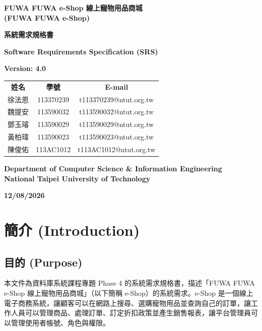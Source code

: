 \documentclass[12pt,a4paper]{article}
\newcommand{\projectname}{FUWA FUWA e-Shop 線上寵物用品商城}
\newcommand{\projectnameEN}{FUWA FUWA e-Shop}
\newcommand{\docdate}{12/08/2026}
\begin{document}
\begin{titlepage}
\centering
\vspace*{1.5cm}
{\Large\bfseries \projectname\\[0.3em] (\projectnameEN)\par}
\vspace{1.5cm}
{\LARGE\bfseries 系統需求規格書\par}
\vspace{0.5cm}
{\Large\bfseries Software Requirements Specification (SRS)\par}
\vspace{0.5cm}
{\large\bfseries Version: 4.0\par}
\vspace{1.2cm}
\renewcommand{\arraystretch}{1.4}
\begin{tabular}{ccc}
\textbf{姓名} & \textbf{學號} & \textbf{E-mail}\\
徐法恩 & 113370239 & t113370239@ntut.org.tw\\
魏提安 & 113590032 & t113590032@ntut.org.tw\\
鄧玉璿 & 113590029 & t113590029@ntut.org.tw\\
黃柏瑋 & 113590023 & t113590023@ntut.org.tw\\
陳俊佑 & 113AC1012 & t113AC1012@ntut.org.tw\\
\end{tabular}
\vfill
{\large\bfseries Department of Computer Science \& Information Engineering\\
National Taipei University of Technology\par}
\vspace{1cm}
{\large\bfseries \docdate\par}
\vspace*{1cm}
\end{titlepage}

\setcounter{page}{1}
\tableofcontents
\clearpage
{}
\setcounter{page}{1}

\section{簡介 (Introduction)}

\subsection{目的 (Purpose)}
本文件為資料庫系統課程專題 Phase 4 的系統需求規格書，描述「\projectname」（以下簡稱 e-Shop）的系統需求。e-Shop 是一個線上電子商務系統，讓顧客可以在網路上搜尋、選購寵物用品並查詢自己的訂單，讓工作人員可以管理商品、處理訂單、訂定折扣政策並產生銷售報表，讓平台管理員可以管理使用者帳號、角色與權限。
\end{document}

